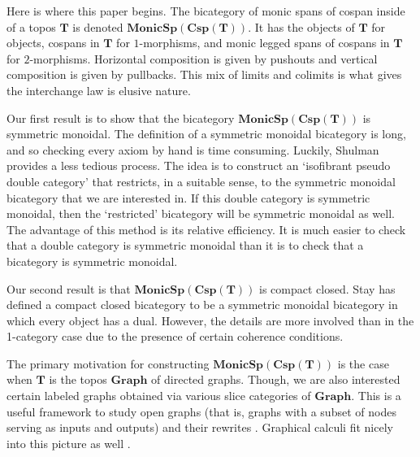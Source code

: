 \documentclass[11pt]{amsart}
\newcommand{\cat}[1]{\mathbf{#1}}
\newcommand{\bimonspcsp}[1]{\mathbf{MonicSp(Csp(#1))}}
\theoremstyle{remark}
\theoremstyle{definition}
\begin{document}
Here is where this paper begins.
The bicategory of monic spans of cospan
inside of a topos $\cat{T}$ is denoted
$\bimonspcsp{T}$. 
It has the objects of $\cat{T}$
for objects,
cospans in $\cat{T}$ for $1$-morphisms,
and monic legged spans of cospans
in $\cat{T}$ for $2$-morphisms.
Horizontal composition is given 
by pushouts and
vertical composition is
given by pullbacks. 
This mix of limits and colimits
is what gives the interchange law
is elusive nature.  

Our first result is to show that 
the bicategory $\bimonspcsp{T}$ 
is symmetric monoidal. 
The definition of a 
symmetric monoidal bicategory is long, 
and so checking every axiom 
by hand is time consuming. 
Luckily, Shulman 
\cite{Shul} 
provides a less tedious process. 
The idea is to construct an 
`isofibrant pseudo double category' 
that restricts, in a suitable sense, 
to the symmetric monoidal bicategory 
that we are interested in.  
If this double category is symmetric monoidal, 
then the `restricted' bicategory will be 
symmetric monoidal as well.  
The advantage of this method 
is its relative efficiency.
It is much easier to check that 
a double category is symmetric monoidal 
than it is to check that a bicategory is symmetric monoidal.

Our second result is that $\bimonspcsp{T}$ 
is compact closed.
Stay \cite{Stay} has defined a 
compact closed bicategory 
to be a symmetric monoidal bicategory 
in which every object has a dual. 
However, the details are 
more involved than in the 1-category case 
due to the presence of certain
coherence conditions.

The primary motivation for constructing $\bimonspcsp{T}$ 
is the case when $\cat{T}$ 
is the topos $\cat{Graph}$ 
of directed graphs.
Though, we are also interested 
certain labeled graphs obtained
via various slice categories of 
$\cat{Graph}$.
This is a useful framework to study 
open graphs (that is, graphs with
a subset of nodes serving as inputs and outputs) 
and their rewrites \cite{Cic}.
Graphical calculi fit nicely
into this picture as well \cite{Cic_zx}.
\end{document}

